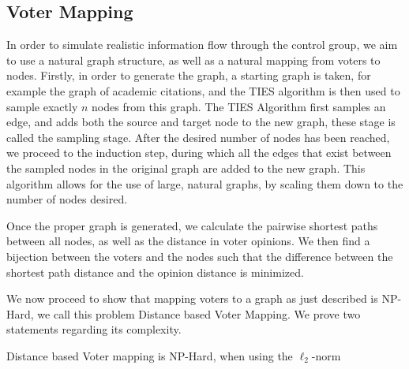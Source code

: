 \subsection{Voter Mapping}
In order to simulate realistic information flow through the control group, we aim to use a natural graph structure, as well as a natural mapping from voters to nodes. Firstly, in order to generate the graph, a starting graph is taken, for example the graph of academic citations, and the TIES \cite{ahmedNetworkSamplingStatic2013} algorithm is then used to sample exactly $n$ nodes from this graph. The TIES Algorithm first samples an edge, and adds both the source and target node to the new graph, these stage is called the sampling stage. After the desired number of nodes has been reached, we proceed to the induction step, during which all the edges that exist between the sampled nodes in the original graph are added to the new graph. This algorithm allows for the use of large, natural graphs, by scaling them down to the number of nodes desired.

Once the proper graph is generated, we calculate the pairwise shortest paths between all nodes, as well as the distance in voter opinions. We then find a bijection between the voters and the nodes such that the difference between the shortest path distance and the opinion distance is minimized.

We now proceed to show that mapping voters to a graph as just described is NP-Hard, we call this problem Distance based Voter Mapping. We prove two statements regarding its complexity.

\begin{theorem}{}
	Distance based Voter mapping is NP-Hard, when using the $\ell_2$-norm
\end{theorem}

